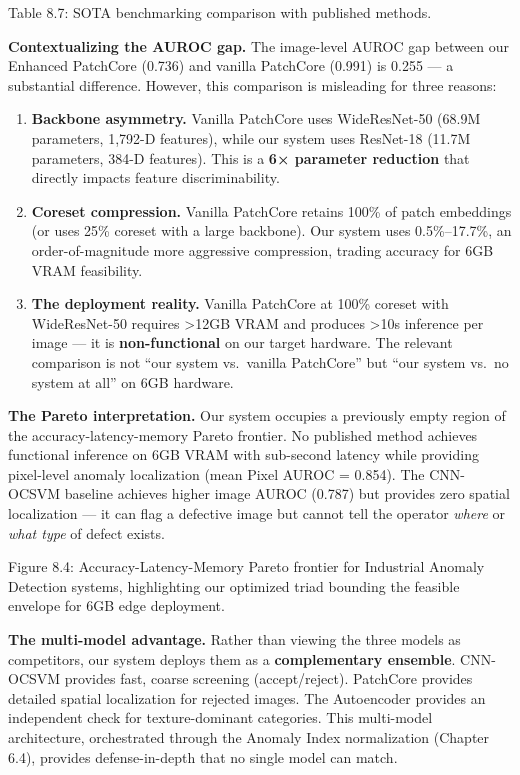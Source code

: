 Table 8.7: SOTA benchmarking comparison with published methods.

\textbf{Contextualizing the AUROC gap.} The image-level AUROC gap between our Enhanced PatchCore (0.736) and vanilla PatchCore (0.991) is 0.255 --- a substantial difference. However, this comparison is misleading for three reasons:

\begin{enumerate}
\def\labelenumi{\arabic{enumi}.}
\item
  \textbf{Backbone asymmetry.} Vanilla PatchCore uses WideResNet-50 (68.9M parameters, 1,792-D features), while our system uses ResNet-18 (11.7M parameters, 384-D features). This is a \textbf{6× parameter reduction} that directly impacts feature discriminability.
\item
  \textbf{Coreset compression.} Vanilla PatchCore retains 100\% of patch embeddings (or uses 25\% coreset with a large backbone). Our system uses 0.5\%--17.7\%, an order-of-magnitude more aggressive compression, trading accuracy for 6GB VRAM feasibility.
\item
  \textbf{The deployment reality.} Vanilla PatchCore at 100\% coreset with WideResNet-50 requires \textgreater12GB VRAM and produces \textgreater10s inference per image --- it is \textbf{non-functional} on our target hardware. The relevant comparison is not ``our system vs.~vanilla PatchCore'' but ``our system vs.~no system at all'' on 6GB hardware.
\end{enumerate}

\textbf{The Pareto interpretation.} Our system occupies a previously empty region of the accuracy-latency-memory Pareto frontier. No published method achieves functional inference on 6GB VRAM with sub-second latency while providing pixel-level anomaly localization (mean Pixel AUROC = 0.854). The CNN-OCSVM baseline achieves higher image AUROC (0.787) but provides zero spatial localization --- it can flag a defective image but cannot tell the operator \emph{where} or \emph{what type} of defect exists.

Figure 8.4: Accuracy-Latency-Memory Pareto frontier for Industrial Anomaly Detection systems, highlighting our optimized triad bounding the feasible envelope for 6GB edge deployment.

\textbf{The multi-model advantage.} Rather than viewing the three models as competitors, our system deploys them as a \textbf{complementary ensemble}. CNN-OCSVM provides fast, coarse screening (accept/reject). PatchCore provides detailed spatial localization for rejected images. The Autoencoder provides an independent check for texture-dominant categories. This multi-model architecture, orchestrated through the Anomaly Index normalization (Chapter 6.4), provides defense-in-depth that no single model can match.

